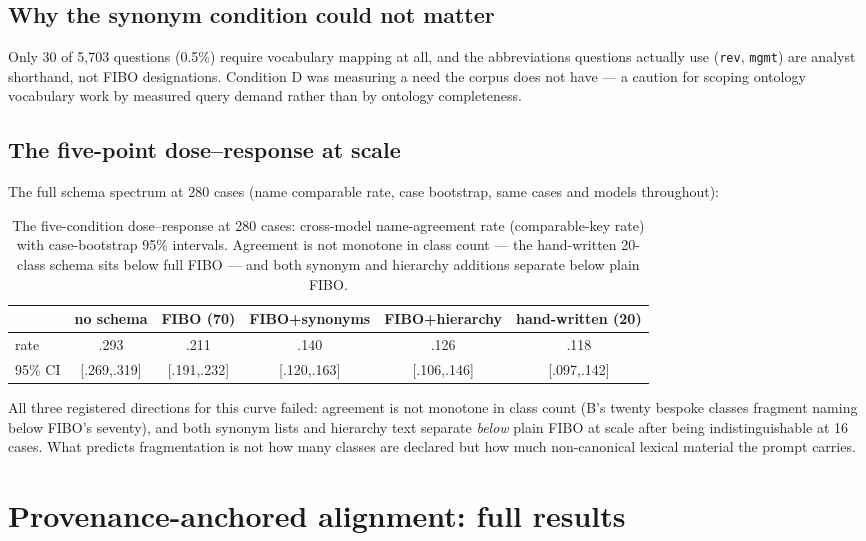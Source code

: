 \documentclass{article}
\begin{document}
\subsection{Why the synonym condition could not matter}

Only 30 of 5{,}703 questions (0.5\%) require vocabulary mapping at all, and
the abbreviations questions actually use (\texttt{rev}, \texttt{mgmt}) are
analyst shorthand, not FIBO designations. Condition D was measuring a need
the corpus does not have --- a caution for scoping ontology vocabulary work
by measured query demand rather than by ontology completeness.


\subsection*{The five-point dose--response at scale}

The full schema spectrum at 280 cases (name comparable rate, case
bootstrap, same cases and models throughout):

\begin{table}[h]
\centering\small
\caption{The five-condition dose--response at 280 cases: cross-model
name-agreement rate (comparable-key rate) with case-bootstrap 95\%
intervals. Agreement is not monotone in class count --- the hand-written
20-class schema sits below full FIBO --- and both synonym and hierarchy
additions separate below plain FIBO.}
\label{tab:dose}
\begin{tabular}{lccccc}
\toprule
 & no schema & FIBO (70) & FIBO+synonyms & FIBO+hierarchy & hand-written (20) \\
\midrule
rate & .293 & .211 & .140 & .126 & .118 \\
95\% CI & [.269,.319] & [.191,.232] & [.120,.163] & [.106,.146] & [.097,.142] \\
\bottomrule
\end{tabular}
\end{table}

All three registered directions for this curve failed: agreement is not
monotone in class count (B's twenty bespoke classes fragment naming below
FIBO's seventy), and both synonym lists and hierarchy text separate
\emph{below} plain FIBO at scale after being indistinguishable at 16 cases.
What predicts fragmentation is not how many classes are declared but how
much non-canonical lexical material the prompt carries.

\section{Provenance-anchored alignment: full results}\label{app:anchor}
\end{document}
